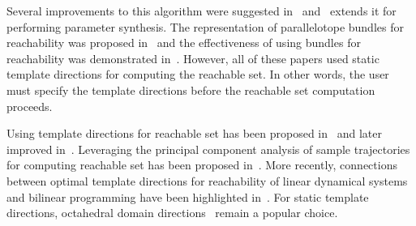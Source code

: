 Several improvements to this algorithm were suggested in~\cite{dang2012reachability, sassi2012reachability} and~\cite{dang2014parameter} extends it for performing parameter synthesis.
The representation of parallelotope bundles for reachability was proposed in~\cite{dreossi2016parallelotope} and the effectiveness of using bundles for reachability was demonstrated in~\cite{dreossi2017sapo, dreossi2017reachability}.
%
However, all of these papers used static template directions for computing the reachable set.
%
In other words, the user must specify the template directions before the reachable set computation proceeds.

Using template directions for reachable set has been proposed in~\cite{sankaranarayanan2008symbolic} and later improved in~\cite{dang2011template}.
%
Leveraging the principal component analysis of sample trajectories for computing reachable set has been proposed in~\cite{stursberg2003efficient,chen2011choice,seladji2017finding}.
%
More recently, connections between optimal template directions for reachability of linear dynamical systems and bilinear programming have been highlighted in~\cite{gronski2019template}.
%
For static template directions, octahedral domain directions~\cite{clariso2004octahedron} remain a popular choice.
